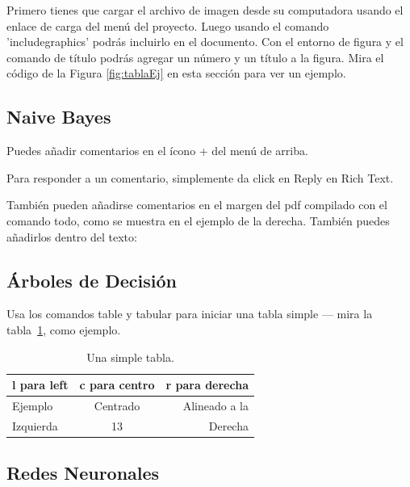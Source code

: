 \documentclass[12pt]{article}
\begin{document}
Primero tienes que cargar el archivo de imagen desde su computadora usando el enlace de carga del menú del proyecto. Luego usando el comando 'includegraphics' podrás incluirlo en el documento. Con el entorno de figura y el comando de título podrás agregar un número y un título a la figura. Mira el código de la Figura \ref{fig:tablaEj} en esta sección para ver un ejemplo.





\subsection{Naive Bayes}
% 
% 
% 

Puedes añadir comentarios en el ícono + del menú de arriba.

Para responder a un comentario, simplemente da click en Reply en Rich Text.


También pueden añadirse comentarios en el margen del pdf compilado con el comando todo, como se muestra en el ejemplo de la derecha. También puedes añadirlos dentro del texto:

\subsection{Árboles de Decisión}

Usa los comandos table y tabular para iniciar una tabla simple --- mira la tabla~\ref{tab:tabla ejemplo}, como ejemplo. 

\begin{table}
\centering
\begin{tabular}{l c r} 
l para left & c para centro & r para derecha \\ \hline
Ejemplo & Centrado & Alineado a la\\
Izquierda & 13 & Derecha
\end{tabular}
\caption{\label{tab:tabla ejemplo}Una simple tabla.}
\end{table}

\subsection{Redes Neuronales}
\end{document}
